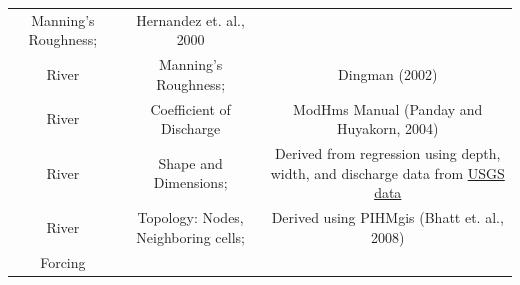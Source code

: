 \documentclass[
]{scrbook}
\begin{document}
\begin{longtable}[]{@{}ccc@{}}
\begin{minipage}[t]{0.24\columnwidth}
Manning's Roughness;\strut
\end{minipage} & \begin{minipage}[t]{0.54\columnwidth}\centering
Hernandez et. al., 2000\strut
\end{minipage}\tabularnewline
\begin{minipage}[t]{0.14\columnwidth}\centering
River\strut
\end{minipage} & \begin{minipage}[t]{0.24\columnwidth}\centering
Manning's Roughness;\strut
\end{minipage} & \begin{minipage}[t]{0.54\columnwidth}\centering
Dingman (2002)\strut
\end{minipage}\tabularnewline
\begin{minipage}[t]{0.14\columnwidth}\centering
River\strut
\end{minipage} & \begin{minipage}[t]{0.24\columnwidth}\centering
Coefficient of Discharge\strut
\end{minipage} & \begin{minipage}[t]{0.54\columnwidth}\centering
ModHms Manual (Panday and Huyakorn, 2004)\strut
\end{minipage}\tabularnewline
\begin{minipage}[t]{0.14\columnwidth}\centering
River\strut
\end{minipage} & \begin{minipage}[t]{0.24\columnwidth}\centering
Shape and Dimensions;\strut
\end{minipage} & \begin{minipage}[t]{0.54\columnwidth}\centering
Derived from regression using depth, width, and discharge data from \href{http://nwis.waterdata.usgs.gov/usa/nwis/measurements}{USGS data}\strut
\end{minipage}\tabularnewline
\begin{minipage}[t]{0.14\columnwidth}\centering
River\strut
\end{minipage} & \begin{minipage}[t]{0.24\columnwidth}\centering
Topology: Nodes, Neighboring cells;\strut
\end{minipage} & \begin{minipage}[t]{0.54\columnwidth}\centering
Derived using PIHMgis (Bhatt et. al., 2008)\strut
\end{minipage}\tabularnewline
\begin{minipage}[t]{0.14\columnwidth}\centering
Forcing\strut

\end{minipage}
\end{longtable}
\end{document}
